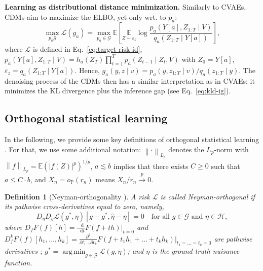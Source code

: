 \documentclass[dvipsnames]{article} %
\DeclareMathOperator*{\argmin}{arg\,min}
\newcommand*\diff{\mathop{}\!\mathrm{d}}
\newcommand{\abs}[1]{\left\lvert #1 \right\rvert}
\newcommand{\norm}[1]{\left\lVert#1\right\rVert}
\newtheorem{definition}{Definition}
\begin{document}
\textbf{Learning as distributional distance minimization.} Similarly to CVAEs, CDMs aim to maximize the ELBO, yet only wrt. to $p_a$:
\begin{equation}
    \max_{p_a \mathcal{G}} \mathcal{L}(g_a) = \max_{p_a \in \mathcal{G}} \mathbb{E}\left[\underset{Z \sim \varepsilon_z }{\mathbb{E}} \log \frac{p_a(Y[a] , Z_{1:T}\mid V)}{q_a(Z_{1:T}\mid Y[a])}\right],
\end{equation}
where $\mathcal{L}$ is defined in Eq.~\eqref{eq:target-risk-id}, $p_a(Y[a] , Z_{1:T}\mid V) = h_a(Z_{T}) \prod_{t=1}^T p_a(Z_{t-1} \mid Z_{t}, V)$ with $Z_0 = Y[a]$,  $\varepsilon_z = q_a(Z_{1:T} \mid Y[a])$. Hence, $g_a(y, z \mid v) = p_a(y , z_{1:T} \mid v) / q_a(z_{1:T} \mid y)$. The denoising process of the CDMs then has a similar interpretation as in CVAEs: it minimizes the KL divergence plus the inference gap (see Eq.~\eqref{eq:kld-ig}).

\newpage
\subsection{Orthogonal statistical learning} \label{app:background-orth-learning}

In the following, we provide some key definitions of orthogonal statistical learning \citep{chernozhukov2018double,foster2023orthogonal,morzywolek2023general}. For that, we use some additional notation: $\norm{\cdot}_{L_p}$ denotes the $L_p$-norm with  $\norm{f}_{L_p} = {\mathbb{E}(\abs{f(Z)}^p)}^{1/p}$, $a \lesssim b$ implies that there exists $C \ge 0$ such that $a \le C \cdot b$, and $X_n = o_{\mathbb{P}}(r_n)$ means $X_n/r_n \stackrel{p}{\to} 0$.

\begin{definition}[Neyman-orthogonality \citep{foster2023orthogonal,morzywolek2023general}]
    A risk $\mathcal{L}$ is called \emph{Neyman-orthogonal} if its pathwise cross-derivatives equal to zero, namely,
    \begin{equation} \label{eq:neym-orth-def}
         D_\eta D_g {\mathcal{L}}(g^*, \eta)[g- g^*, \hat{\eta} - \eta] = 0 \quad \text{for all } g \in \mathcal{G} \text{ and } \eta \in \mathcal{H},
    \end{equation}
    where $D_f F(f)[h] = \frac{\diff}{\diff{t}} F (f + th) \vert_{t=0}$ and $D_f^k F(f)[h_1, \dots, h_k] = \frac{\partial^k}{\partial{t_1} \dots \partial{t_k}} F (f + t_1 h_1 + \dots + t_k h_k)  \vert_{t_1=\dots=t_k = 0}$ are pathwise derivatives \citep{foster2023orthogonal}; $g^* = \argmin_{g \in \mathcal{G}} \mathcal{L}(g, \eta)$; and $\eta$ is the ground-truth nuisance function. 
\end{definition}
\end{document}
